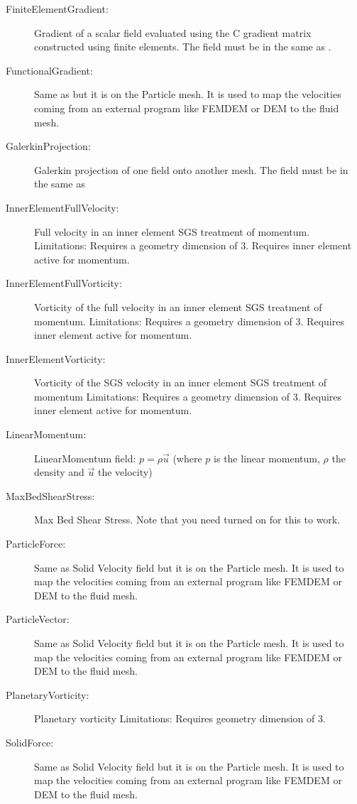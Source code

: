 \begin{description}
 \item[FiniteElementGradient:]Gradient of a scalar field evaluated using the C gradient matrix constructed using finite elements. The field must be in the same  as . 
  \item[FunctionalGradient:]Same as  but it is on the Particle mesh. It is used to map the velocities coming from an external program like FEMDEM or DEM to the fluid mesh.    
 \item[GalerkinProjection:]Galerkin projection of one field onto another mesh. The field must be in the same  as      
 \item[InnerElementFullVelocity:]Full velocity in an inner element SGS treatment of momentum.
  Limitations: Requires a geometry dimension of 3. Requires inner element active for momentum. 
 \item[InnerElementFullVorticity:]Vorticity of the full velocity in an inner element SGS treatment of momentum.
  Limitations: Requires a geometry dimension of 3. Requires inner element active for momentum. 
 \item[InnerElementVorticity:]Vorticity of the SGS velocity in an inner element SGS treatment of momentum
  Limitations: Requires a geometry dimension of 3. Requires inner element active for momentum.
 \item[LinearMomentum:]LinearMomentum field: $p = \rho \vec{u}$ (where $p$ is the linear momentum, $\rho$ the density and $\vec{u}$ the velocity)
 \item[MaxBedShearStress:]Max Bed Shear Stress. Note that you need  turned on for this to work.    
 \item[ParticleForce:] Same as Solid Velocity field but it is on the Particle mesh. It is used to map the velocities coming from an external program like FEMDEM or DEM to the fluid mesh.       
 \item[ParticleVector:]Same as Solid Velocity field but it is on the Particle mesh. It is used to map the velocities coming from an external program like FEMDEM or DEM to the fluid mesh.   
 \item[PlanetaryVorticity:]Planetary vorticity
	Limitations: Requires geometry dimension of 3. 
 \item[SolidForce:]Same as Solid Velocity field but it is on the Particle mesh. It is used to map the velocities coming from an external program like FEMDEM or DEM to the fluid mesh.    

\end{description}
